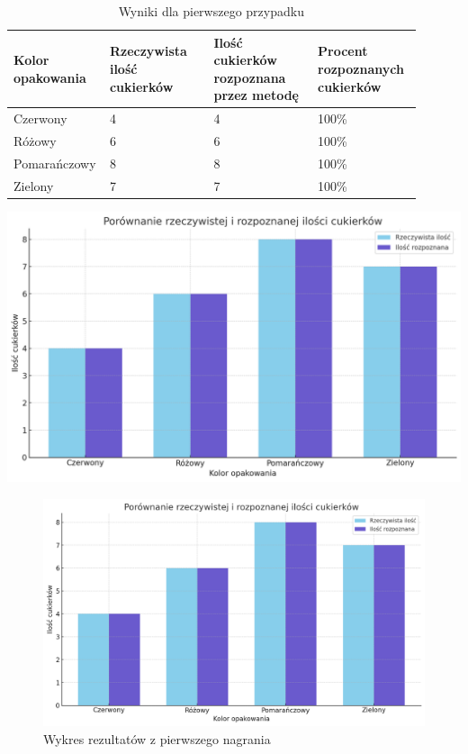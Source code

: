 \documentclass{article}
\begin{document}
\begin{table}[H]
\centering
\label{tab:video1}
\begin{tabular}{|p{0.15\linewidth}|p{0.25\linewidth}|p{0.25\linewidth}|p{0.25\linewidth}|}
 \hline
 Kolor opakowania & Rzeczywista ilość cukierków & Ilość cukierków rozpoznana przez metodę & Procent rozpoznanych cukierków \\
 \hline
 Czerwony & 4 & 4 & 100\% \\
 \hline
 Różowy & 6 & 6 & 100\% \\
 \hline
 Pomarańczowy & 8 & 8 & 100\% \\
 \hline
 Zielony & 7 & 7 & 100\% \\
 \hline
\end{tabular}
\caption{Wyniki dla pierwszego przypadku}
\end{table}

\begin{center}
\includegraphics[width=\linewidth]{wykres1.png}
\end{center}

\begin{figure}[H]
    \centering
    \includegraphics[width=\linewidth]{wykres1.png}
    \caption{Wykres rezultatów z pierwszego nagrania}
    \label{fig:ukladPomiarowy}
\end{figure}
\end{document}
